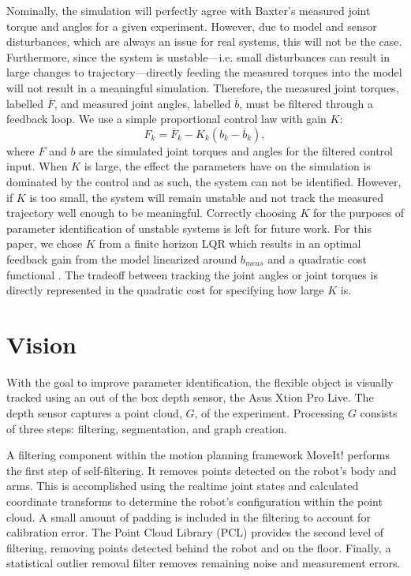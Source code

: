 \documentclass[runningheads,a4paper]{llncs}
\begin{document}
Nominally, the simulation will perfectly agree with Baxter's measured joint torque and angles for a given experiment. However, due to model and sensor disturbances, which are always an issue for real systems, this will not be the case. Furthermore, since the system is unstable---i.e. small disturbances can result in large changes to trajectory---directly feeding the measured torques into the model will not result in a meaningful simulation. Therefore, the measured joint torques, labelled $\overline{F}$, and measured joint angles, labelled $\overline{b}$, must be filtered through a feedback loop. We use a simple proportional control law with gain $K$: 
\[
F_k = \overline{F}_k - K_k (b_k - \overline{b}_k),
\]
where $F$ and $b$ are the simulated joint torques and angles for the filtered control input.  When $K$ is large, the effect the parameters have on the simulation is dominated by the control and as such, the system can not be identified. However, if $K$ is too small, the system will remain unstable and not track the measured trajectory well enough to be meaningful.  Correctly choosing $K$ for the purposes of parameter identification of unstable systems is left for future work.  For this paper, we chose $K$ from a finite horizon LQR which results in an optimal feedback gain from the model linearized around $b_{meas}$ and a quadratic cost functional \cite{anderson_moore}.  The tradeoff between tracking the joint angles or joint torques is directly represented in the quadratic cost for specifying how large $K$ is.


\section{Vision}
\label{sec-vis}
With the goal to improve parameter identification, the flexible object is visually tracked using an out of the box depth sensor, the Asus Xtion Pro Live. The depth sensor captures a point cloud, $G$, of the experiment. Processing $G$ consists of three steps: filtering, segmentation, and graph creation. 

A filtering component within the motion planning framework MoveIt! \cite{coleman_etal_barrier} performs the first step of self-filtering. It removes points detected on the robot’s body and arms. This is accomplished using the realtime joint states and calculated coordinate transforms to determine the robot’s configuration within the point cloud. A small amount of padding is included in the filtering to account for calibration error. The Point Cloud Library (PCL) \cite{rusu20113d} provides the second level of filtering, removing points detected behind the robot and on the floor. Finally, a statistical outlier removal filter removes remaining noise and measurement errors.
\end{document}
